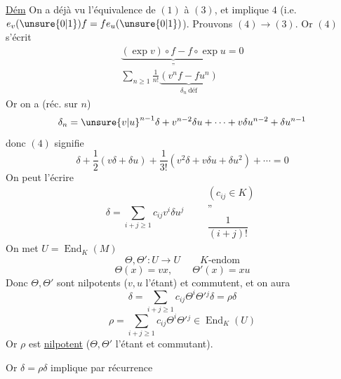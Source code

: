 \uline{Dém} On a déjà vu l'équivalence de $(1)$ à $(3)$, et   implique $4$ (i.e. $e_v(\unsure{0|1})f=fe_u(\unsure{0|1})$). Prouvons $(4)\longrightarrow(3)$. Or $(4)$ s'écrit
\[
\begin{gathered}
\underbrace{(\exp v)\circ f-f\circ\exp u}_{\text{''}}=0\\
\sum_{n\geq1}\frac1{n!}\underbrace{(v^nf-fu^n)}_{\delta_n\ \mathrm{déf}}
\end{gathered}
\]
Or on a (réc. sur $n$)
\[
\delta_n=\unsure{v|u}^{n-1}\delta+v^{n-2}\delta u+\cdots+v\delta u^{n-2}+\delta u^{n-1}
\]
donc $(4)$ signifie
\[
\delta+\frac12(v\delta+\delta u)+\frac1{3!}(v^2\delta+v\delta u+\delta u^2)+\cdots=0
\]
On peut l'écrire
\[
\delta=\sum_{i+j\geq1}c_{ij}v^i\delta u^j
\qquad\begin{array}{c}(c_{ij}\in K)\\\text{''}\\\dfrac1{(i+j)!}\end{array}
\]
On met $U=\operatorname{End}_K(M)$
\[
\Theta,\Theta':U\longrightarrow U\qquad K\text{-endom}
\]
\[
\Theta(x)=vx,\qquad\Theta'(x)=xu
\]
Donc $\Theta,\Theta'$ sont nilpotents ($v,u$ l'étant) et commutent, et on aura
\[
\delta=\sum_{i+j\geq1}c_{ij}\Theta^i\Theta'{}^j\delta=\rho\delta
\]
\[
\rho=\sum_{i+j\geq1}c_{ij}\Theta^i\Theta'{}^j\in\operatorname{End}_K(U)
\]
Or $\rho$ est \uline{nilpotent} ($\Theta,\Theta'$ l'étant et commutant).

Or $\delta=\rho\delta$ implique par récurrence
